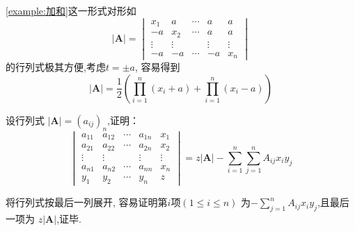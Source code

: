 \begin{brown}
\begin{example}
    \cref{example:加和}这一形式对形如
\[
\left|\bm{A}\right|=
\begin{vmatrix}
    x_1&a&\cdots&a&a\\
    -a&x_2&\cdots&a&a\\
    \vdots&\vdots&&\vdots&\vdots\\
    -a&-a&\cdots&-a&x_n
\end{vmatrix}
\]
的行列式极其方便,考虑$t=\pm a$,
容易得到
\[
\left|\bm{A}\right|=\frac{1}{2}
\left(\prod_{i=1}^{n}\left(x_i+a\right)+
\prod_{i=1}^{n}\left(x_i-a\right)\right)
\]
\end{example}
\end{brown}
\begin{brown}
\begin{example}\label{ex:加和}
设行列式
$\left|\bm{A}\right|
=\left(a_{ij}\right)_n$,证明：
\[
\begin{vmatrix}
	a_{11} & a_{12}&\cdots & a_{1n}&x_1\\
    a_{21}& a_{22}&\cdots&a_{2n}&x_2\\
	\vdots &\vdots&&\vdots&\vdots\\
	a_{n1}&a_{n2}&\cdots &a_{nn}&x_n\\
    y_1&y_2&\cdots&y_n&z
\end{vmatrix}=
z\left|\bm{A}\right|
-\sum_{i=1}^{n}\sum_{j=1}^{n}A_{ij}x_iy_j
\]
\end{example}
\begin{Proof}
将行列式按最后一列展开,
容易证明第$i$项$\left(1\leqslant i\leqslant n\right)$
为$\displaystyle -\sum_{j=1}^{n}A_{ij}x_iy_j$,且最后一项为
$z\left|\bm{A}\right|$,证毕.
\end{Proof}
\end{brown}
